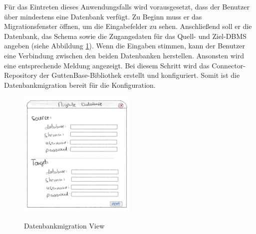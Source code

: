 Für das Eintreten dieses Anwendungsfalls wird vorausgesetzt, dass der Benutzer über mindestens eine Datenbank verfügt. Zu Beginn muss er das Migrationsfenster öffnen, um die Eingabefelder zu sehen. Anschließend soll er die Datenbank, das Schema sowie die Zugangsdaten für das Quell- und Ziel-DBMS angeben (siehe Abbildung \ref{img:generalview}). 
Wenn die Eingaben stimmen, kann der Benutzer eine Verbindung zwischen den beiden Datenbanken herstellen. Ansonsten wird eine entsprechende Meldung angezeigt. Bei diesem Schritt wird das Connector-Repository der GuttenBase-Bibliothek erstellt und konfiguriert. Somit ist die Datenbankmigration bereit für die Konfiguration.
\begin{figure}[H]
	\caption{Datenbankmigration View}
	\centering
	\includegraphics[width=0.5\textwidth]{images/generalview}
	\label{img:generalview}
\end{figure}
